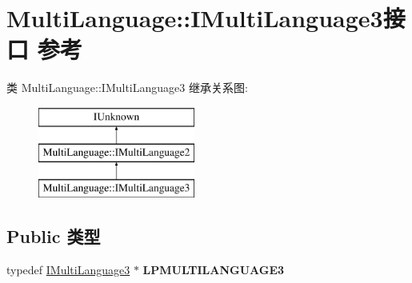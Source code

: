 \hypertarget{interface_multi_language_1_1_i_multi_language3}{}\section{Multi\+Language\+:\+:I\+Multi\+Language3接口 参考}
\label{interface_multi_language_1_1_i_multi_language3}
类 Multi\+Language\+:\+:I\+Multi\+Language3 继承关系图\+:\begin{figure}[H]
\begin{center}
\leavevmode
\includegraphics[height=3.000000cm]{interface_multi_language_1_1_i_multi_language3}
\end{center}
\end{figure}
\subsection*{Public 类型}
\begin{DoxyCompactItemize}
\item 
\mbox{\label{interface_multi_language_1_1_i_multi_language3_af047dd8546370c19d01b81dca75d7b4f}} 
typedef \hyperlink{interface_multi_language_1_1_i_multi_language3}{I\+Multi\+Language3} $\ast$ {\bfseries L\+P\+M\+U\+L\+T\+I\+L\+A\+N\+G\+U\+A\+G\+E3}
\end{DoxyCompactItemize}
